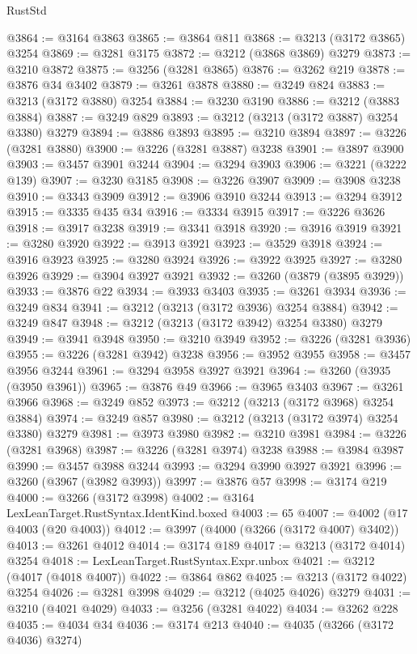 \begin{lexlean}{RustStd}
\begin{coremodule}
@3864 := @3164 @3863
@3865 := @3864 @811
@3868 := @3213 (@3172 @3865) @3254
@3869 := @3281 @3175
@3872 := @3212 (@3868 @3869) @3279
@3873 := @3210 @3872
@3875 := @3256 (@3281 @3865)
@3876 := @3262 @219
@3878 := @3876 @34 @3402
@3879 := @3261 @3878
@3880 := @3249 @824
@3883 := @3213 (@3172 @3880) @3254
@3884 := @3230 @3190
@3886 := @3212 (@3883 @3884)
@3887 := @3249 @829
@3893 := @3212 (@3213 (@3172 @3887) @3254 @3380) @3279
@3894 := @3886 @3893
@3895 := @3210 @3894
@3897 := @3226 (@3281 @3880)
@3900 := @3226 (@3281 @3887) @3238
@3901 := @3897 @3900
@3903 := @3457 @3901 @3244
@3904 := @3294 @3903
@3906 := @3221 (@3222 @139)
@3907 := @3230 @3185
@3908 := @3226 @3907
@3909 := @3908 @3238
@3910 := @3343 @3909
@3912 := @3906 @3910 @3244
@3913 := @3294 @3912
@3915 := @3335 @435 @34
@3916 := @3334 @3915
@3917 := @3226 @3626
@3918 := @3917 @3238
@3919 := @3341 @3918
@3920 := @3916 @3919
@3921 := @3280 @3920
@3922 := @3913 @3921
@3923 := @3529 @3918
@3924 := @3916 @3923
@3925 := @3280 @3924
@3926 := @3922 @3925
@3927 := @3280 @3926
@3929 := @3904 @3927 @3921
@3932 := @3260 (@3879 (@3895 @3929))
@3933 := @3876 @22
@3934 := @3933 @3403
@3935 := @3261 @3934
@3936 := @3249 @834
@3941 := @3212 (@3213 (@3172 @3936) @3254 @3884)
@3942 := @3249 @847
@3948 := @3212 (@3213 (@3172 @3942) @3254 @3380) @3279
@3949 := @3941 @3948
@3950 := @3210 @3949
@3952 := @3226 (@3281 @3936)
@3955 := @3226 (@3281 @3942) @3238
@3956 := @3952 @3955
@3958 := @3457 @3956 @3244
@3961 := @3294 @3958 @3927 @3921
@3964 := @3260 (@3935 (@3950 @3961))
@3965 := @3876 @49
@3966 := @3965 @3403
@3967 := @3261 @3966
@3968 := @3249 @852
@3973 := @3212 (@3213 (@3172 @3968) @3254 @3884)
@3974 := @3249 @857
@3980 := @3212 (@3213 (@3172 @3974) @3254 @3380) @3279
@3981 := @3973 @3980
@3982 := @3210 @3981
@3984 := @3226 (@3281 @3968)
@3987 := @3226 (@3281 @3974) @3238
@3988 := @3984 @3987
@3990 := @3457 @3988 @3244
@3993 := @3294 @3990 @3927 @3921
@3996 := @3260 (@3967 (@3982 @3993))
@3997 := @3876 @57
@3998 := @3174 @219
@4000 := @3266 (@3172 @3998)
@4002 := @3164 LexLeanTarget.RustSyntax.IdentKind.boxed
@4003 := 65
@4007 := @4002 (@17 @4003 (@20 @4003))
@4012 := @3997 (@4000 (@3266 (@3172 @4007) @3402))
@4013 := @3261 @4012
@4014 := @3174 @189
@4017 := @3213 (@3172 @4014) @3254
@4018 := LexLeanTarget.RustSyntax.Expr.unbox
@4021 := @3212 (@4017 (@4018 @4007))
@4022 := @3864 @862
@4025 := @3213 (@3172 @4022) @3254
@4026 := @3281 @3998
@4029 := @3212 (@4025 @4026) @3279
@4031 := @3210 (@4021 @4029)
@4033 := @3256 (@3281 @4022)
@4034 := @3262 @228
@4035 := @4034 @34
@4036 := @3174 @213
@4040 := @4035 (@3266 (@3172 @4036) @3274)

\end{coremodule}
\end{lexlean}

